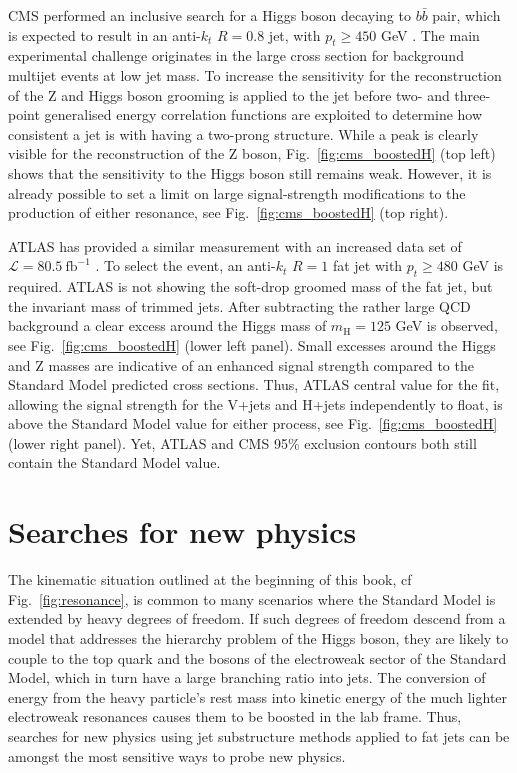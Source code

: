 CMS performed an inclusive search for a Higgs boson decaying to $b\bar{b}$ pair, which is expected to result in an anti-$k_t$ $R=0.8$ jet, with $p_t \geq 450$ GeV \cite{Sirunyan:2017dgc}. The main experimental challenge originates in the large cross section for background multijet events at low jet mass. To increase the sensitivity for the reconstruction of the Z and Higgs boson \SD grooming is applied to the jet before two- and three-point generalised energy correlation functions are exploited to determine how consistent a jet is with having a two-prong structure. While a peak is clearly visible for the reconstruction of the Z boson, Fig.~\ref{fig:cms_boostedH} (top left) shows that the sensitivity to the Higgs boson still remains weak. However, it is already possible to set a limit on large signal-strength modifications to the production of either resonance, see Fig.~\ref{fig:cms_boostedH} (top right).

ATLAS has provided a similar measurement with an increased data set of $\mathcal{L} = 80.5~\mathrm{fb}^{-1}$ \cite{ATLAS:2018hzj}. To select the event, an anti-$k_t$ $R=1$ fat jet with $p_t \geq 480$ GeV is required. ATLAS is not showing the soft-drop groomed mass of the fat jet, but the invariant mass of trimmed jets. After subtracting the rather large QCD background a clear excess around the Higgs mass of $m_\text{H}=125$ GeV is observed, see Fig.~\ref{fig:cms_boostedH} (lower left panel). Small excesses around the Higgs and Z masses are indicative of an enhanced signal strength compared to the Standard Model predicted cross sections. Thus, ATLAS central value for the fit, allowing the signal strength for the V+jets and H+jets independently to float, is above the Standard Model value for either process, see Fig.~\ref{fig:cms_boostedH} (lower right panel). Yet, ATLAS and CMS 95\% exclusion contours both still contain the Standard Model value.

\section{Searches for new physics}

The kinematic situation outlined at the beginning of this book, cf Fig.~\ref{fig:resonance}, is common to many scenarios where the Standard Model is extended by heavy degrees of freedom. If such degrees of freedom descend from a model that addresses the hierarchy problem of the Higgs boson, they are likely to couple to the top quark and the bosons of the electroweak sector of the Standard Model, which in turn have a large branching ratio into jets. The conversion of energy from the heavy particle's rest mass into kinetic energy of the much lighter electroweak resonances causes them to be boosted in the lab frame. Thus, searches for new physics using jet substructure methods applied to fat jets can be amongst the most sensitive ways to probe new physics.


